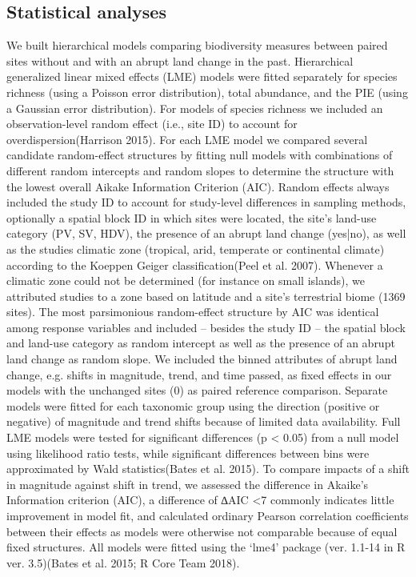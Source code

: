 \subsection{Statistical analyses} 
We built hierarchical models comparing biodiversity measures between paired sites without and with an abrupt land change in the past. Hierarchical generalized linear mixed effects (LME) models were fitted separately for species richness (using a Poisson error distribution), total abundance, and the PIE (using a Gaussian error distribution). For models of species richness we included an observation-level random effect (i.e., site ID) to account for overdispersion(Harrison 2015). For each LME model we compared several candidate random-effect structures by fitting null models with combinations of different random intercepts and random slopes to determine the structure with the lowest overall Aikake Information Criterion (AIC). Random effects always included the study ID to account for study-level differences in sampling methods, optionally a spatial block ID in which sites were located, the site’s land-use category (PV, SV, HDV), the presence of an abrupt land change (yes|no), as well as the studies climatic zone (tropical, arid, temperate or continental climate) according to the Koeppen Geiger classification(Peel et al. 2007). Whenever a climatic zone could not be determined (for instance on small islands), we attributed studies to a zone based on latitude and a site’s terrestrial biome (1369 sites). The most parsimonious random-effect structure by AIC was identical among response variables and included – besides the study ID – the spatial block and land-use category as random intercept as well as the presence of an abrupt land change as random slope. We included the binned attributes of abrupt land change, e.g. shifts in magnitude, trend, and time passed, as fixed effects in our models with the unchanged sites (0) as paired reference comparison. Separate models were fitted for each taxonomic group using the direction (positive or negative) of magnitude and trend shifts because of limited data availability. Full LME models were tested for significant differences (p < 0.05) from a null model using likelihood ratio tests, while significant differences between bins were approximated by Wald statistics(Bates et al. 2015). To compare impacts of a shift in magnitude against shift in trend, we assessed the difference in Akaike’s Information criterion (AIC), a difference of ∆AIC <7 commonly indicates little improvement in model fit, and calculated ordinary Pearson correlation coefficients between their effects as models were otherwise not comparable because of equal fixed structures. All models were fitted using the ‘lme4’ package (ver. 1.1-14 in R ver. 3.5)(Bates et al. 2015; R Core Team 2018). 

